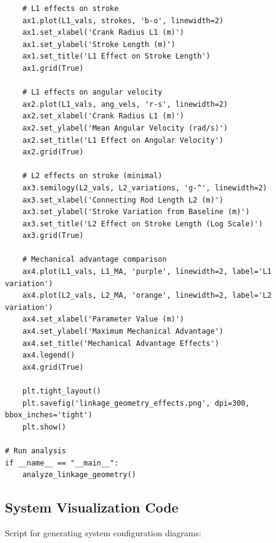 \documentclass[10pt]{article}
\begin{document}
\begin{verbatim}
    # L1 effects on stroke
    ax1.plot(L1_vals, strokes, 'b-o', linewidth=2)
    ax1.set_xlabel('Crank Radius L1 (m)')
    ax1.set_ylabel('Stroke Length (m)')
    ax1.set_title('L1 Effect on Stroke Length')
    ax1.grid(True)
    
    # L1 effects on angular velocity
    ax2.plot(L1_vals, ang_vels, 'r-s', linewidth=2)
    ax2.set_xlabel('Crank Radius L1 (m)')
    ax2.set_ylabel('Mean Angular Velocity (rad/s)')
    ax2.set_title('L1 Effect on Angular Velocity')
    ax2.grid(True)
    
    # L2 effects on stroke (minimal)
    ax3.semilogy(L2_vals, L2_variations, 'g-^', linewidth=2)
    ax3.set_xlabel('Connecting Rod Length L2 (m)')
    ax3.set_ylabel('Stroke Variation from Baseline (m)')
    ax3.set_title('L2 Effect on Stroke Length (Log Scale)')
    ax3.grid(True)
    
    # Mechanical advantage comparison
    ax4.plot(L1_vals, L1_MA, 'purple', linewidth=2, label='L1 variation')
    ax4.plot(L2_vals, L2_MA, 'orange', linewidth=2, label='L2 variation')
    ax4.set_xlabel('Parameter Value (m)')
    ax4.set_ylabel('Maximum Mechanical Advantage')
    ax4.set_title('Mechanical Advantage Effects')
    ax4.legend()
    ax4.grid(True)
    
    plt.tight_layout()
    plt.savefig('linkage_geometry_effects.png', dpi=300, bbox_inches='tight')
    plt.show()

# Run analysis
if __name__ == "__main__":
    analyze_linkage_geometry()
\end{verbatim}

\subsection{System Visualization Code}

Script for generating system configuration diagrams:
\end{document}
